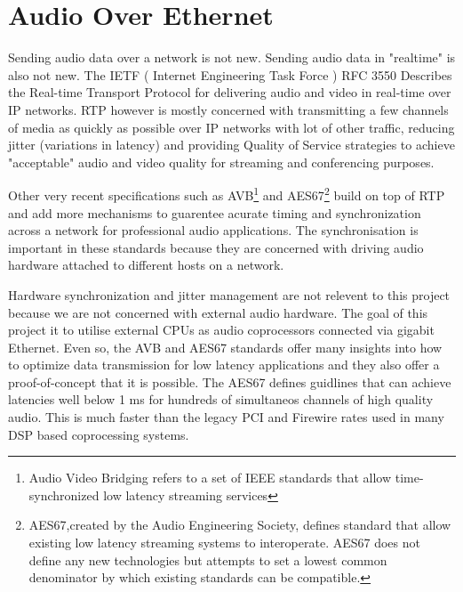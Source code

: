\section{Audio Over Ethernet}

Sending audio data over a network is not new. Sending audio data in "realtime" is also not new. The IETF ( Internet Engineering Task Force ) RFC 3550 Describes the Real-time Transport Protocol for delivering audio and video in real-time over IP networks. RTP however is mostly concerned with transmitting a few channels of media as quickly as possible over IP networks with lot of other traffic, reducing jitter (variations in latency) and providing Quality of Service strategies to achieve "acceptable" audio and video quality for streaming and conferencing purposes.

Other very recent specifications such as AVB\footnote{Audio Video Bridging refers to a set of IEEE standards that allow time-synchronized low latency streaming services } and AES67\footnote{AES67,created by the Audio Engineering Society, defines standard that allow existing low latency streaming systems to interoperate. AES67 does not define any new technologies but attempts to set a lowest common denominator by which existing standards can be compatible. } build on top of RTP and add more mechanisms to guarentee acurate timing and synchronization across a network for professional audio applications. The synchronisation is important in these standards because they are concerned with driving audio hardware attached to different hosts on a network.

Hardware synchronization and jitter management are not relevent to this project because we are not concerned with external audio hardware. The goal of this project it to utilise external CPUs as audio coprocessors connected via gigabit Ethernet. Even so, the AVB and AES67 standards offer many insights into how to optimize data transmission for low latency applications and they also offer a proof-of-concept that it is possible. The AES67 defines guidlines that can achieve latencies well below 1 ms for hundreds of simultaneos channels of high quality audio. This is much faster than the legacy PCI and Firewire rates used in many DSP based coprocessing systems\cite{bouillot2009aes}.

